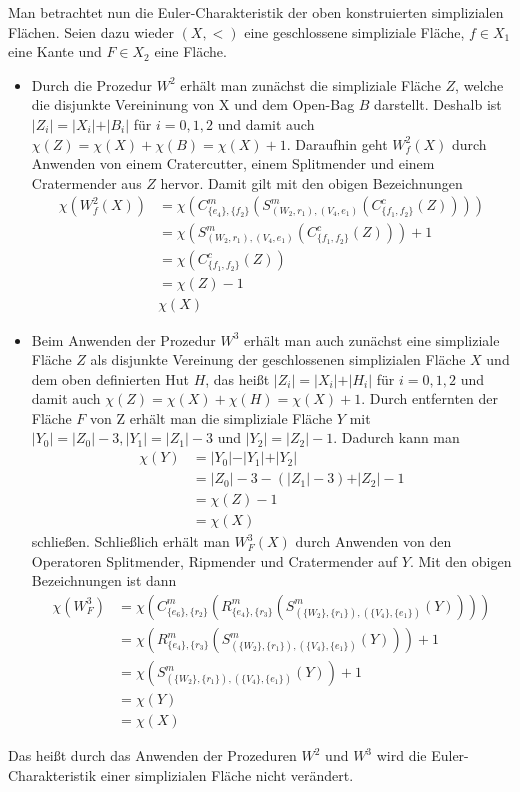 \documentclass[12pt,titlepage]{article}
\begin{document}
Man betrachtet nun die Euler-Charakteristik der oben konstruierten simplizialen Flächen. Seien dazu wieder $(X,<)$ eine geschlossene simpliziale Fläche, $f\in X_1$ eine Kante und $F\in X_2$ eine Fläche.
\begin{itemize}
\item Durch die Prozedur $W^2$ erhält man zunächst die simpliziale Fläche $Z$, welche die disjunkte Vereininung von X und dem Open-Bag $B$ darstellt. Deshalb ist $\vert Z_i\vert= \vert X_i \vert+\vert B_i\vert$ für $i=0,1,2$ und damit auch $\chi(Z)=\chi(X)+\chi(B)=\chi(X)+1.$ Daraufhin geht $W^2_f(X)$ durch Anwenden von einem Cratercutter, einem Splitmender und einem Cratermender aus $Z$ hervor. Damit gilt mit den obigen Bezeichnungen 
\begin{align*}
\chi(W^2_f(X))&=\chi(C_{\{e_4\},\{f_2\}}^m(S^m_{(W_2,r_1),(V_4,e_1)}(C_{\{f_1,f_2\}}^c(Z))))\\
&=\chi(S^m_{(W_2,r_1),(V_4,e_1)}(C_{\{f_1,f_2\}}^c(Z)))+1\\
&=\chi(C_{\{f_1,f_2\}}^c(Z))\\
&=\chi(Z)-1\\
&\chi(X)
\end{align*}

\item Beim Anwenden der Prozedur $W^3$ erhält man auch zunächst eine simpliziale Fläche $Z$ als disjunkte Vereinung der geschlossenen simplizialen Fläche $X$ und dem oben definierten Hut $H$, das heißt $\vert Z_i\vert= \vert X_i \vert+\vert H_i\vert$ für $i=0,1,2$ und damit auch $\chi(Z)=\chi(X)+\chi(H)=\chi(X)+1.$ Durch entfernten der Fläche $F$ von Z erhält man die simpliziale Fläche $Y$ mit $\vert Y_0\vert= \vert Z_0 \vert-3,\vert Y_1\vert= \vert Z_1 \vert-3$ und $\vert Y_2\vert= \vert Z_2 \vert-1$. Dadurch kann man 
\begin{align*}
\chi(Y)&=\vert Y_0 \vert-\vert Y_1 \vert+\vert Y_2 \vert\\
&=\vert Z_0 \vert-3-(\vert Z_1 \vert-3)+\vert Z_2 \vert-1\\
&=\chi(Z)-1\\
&=\chi(X)
\end{align*}
schließen. Schließlich erhält man $W^3_F(X)$ durch Anwenden von den Operatoren Splitmender, Ripmender und Cratermender auf $Y$. Mit den obigen Bezeichnungen ist dann 
\begin{align*}
\chi(W_F^3)&=\chi(C^m_{\{e_6\},\{r_2\}}(R^m_{\{e_4\},\{r_3\}}(S^m_{(\{W_2\},\{r_1\}),(\{V_4\},\{e_1\})}(Y))))\\
&=\chi(R^m_{\{e_4\},\{r_3\}}(S^m_{(\{W_2\},\{r_1\}),(\{V_4\},\{e_1\})}(Y)))+1\\
&=\chi(S^m_{(\{W_2\},\{r_1\}),(\{V_4\},\{e_1\})}(Y))+1\\
&=\chi(Y)\\
&=\chi(X)
\end{align*}
\end{itemize}
Das heißt durch das Anwenden der Prozeduren $W^2$ und $W^3$ wird die Euler-Charakteristik einer simplizialen Fläche nicht verändert.
\newpage
\end{document}
